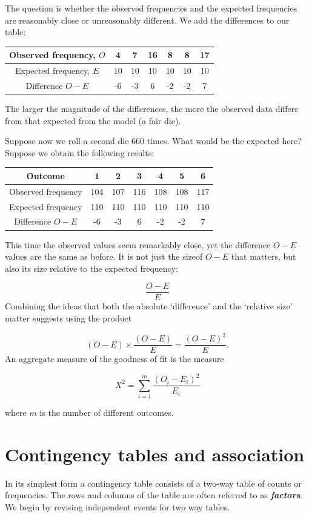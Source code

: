 \documentclass[
]{book}
\theoremstyle{definition}
\theoremstyle{definition}
\theoremstyle{definition}
\theoremstyle{definition}
\theoremstyle{remark}
\begin{document}
The question is whether the observed frequencies and the expected frequencies are reasonably close or unreasonably different. We add the differences to our table:

\begin{longtable}[]{@{}ccccccc@{}}
\toprule
Observed frequency, \(O\) & 4 & 7 & 16 & 8 & 8 & 17\tabularnewline
\midrule
\endhead
Expected frequency, \(E\) & 10 & 10 & 10 & 10 & 10 & 10\tabularnewline
Difference \(O-E\) & -6 & -3 & 6 & -2 & -2 & 7\tabularnewline
\bottomrule
\end{longtable}

The larger the magnitude of the differences, the more the observed data differs from that expected from the model (a fair die).

Suppose now we roll a second die \(660\) times. What would be the expected here? Suppose we obtain the following results:

\begin{longtable}[]{@{}ccccccc@{}}
\toprule
Outcome & 1 & 2 & 3 & 4 & 5 & 6\tabularnewline
\midrule
\endhead
Observed frequency & 104 & 107 & 116 & 108 & 108 & 117\tabularnewline
Expected frequency & 110 & 110 & 110 & 110 & 110 & 110\tabularnewline
Difference \(O-E\) & -6 & -3 & 6 & -2 & -2 & 7\tabularnewline
\bottomrule
\end{longtable}

This time the observed values seem remarkably close, yet the difference \(O-E\) values are the same as before.
It is not just the sizeof \(O-E\) that matters, but also its size relative to the expected frequency:

\[\frac{O-E}{E}\]
Combining the ideas that both the absolute `difference' and the `relative size' matter suggests using the product

\[(O-E)\times\frac{(O-E)}{E} = \frac{(O-E)^2}{E}.\]
An aggregate measure of the goodness of fit is the measure

\[X^2 = \sum_{i=1}^m \frac{(O_i-E_i)^2}{E_i}\]

where \(m\) is the number of different outcomes.

\hypertarget{contingency-tables-and-association}{%
\section{Contingency tables and association}\label{contingency-tables-and-association}}

In its simplest form a contingency table consists of a two-way table of counts or frequencies. The rows and columns of the table are often referred to as \textbf{\emph{factors}}. We begin by revising independent events for two way tables.
\end{document}

